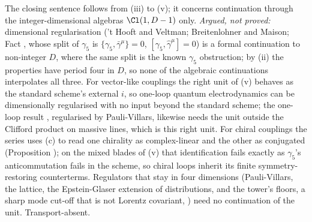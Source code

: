 The closing sentence follows from (iii) to (v); it concerns continuation through the integer-dimensional algebras $\Cl(1, D-1)$ only. \emph{Argued, not proved:} dimensional regularisation ('t Hooft and Veltman; Breitenlohner and Maison; Fact , whose split of $\gamma_5$ is $\{\gamma_5, \bar{\gamma}^{\mu}\} = 0$, $[\gamma_5, \hat{\gamma}^{\mu}] = 0$) is a formal continuation to non-integer $D$, where the same split is the known $\gamma_5$ obstruction; by (ii) the properties have period four in $D$, so none of the algebraic continuations interpolates all three. For vector-like couplings the right unit of (v) behaves as the standard scheme's external $i$, so one-loop quantum electrodynamics can be dimensionally regularised with no input beyond the standard scheme; the one-loop result , regularised by Pauli-Villars, likewise needs the unit outside the Clifford product on massive lines, which is this right unit. For chiral couplings the series uses (c) to read one chirality as complex-linear and the other as conjugated (Proposition ); on the mixed blades of (v) that identification fails exactly as $\gamma_5$'s anticommutation fails in the scheme, so chiral loops inherit its finite symmetry-restoring counterterms. Regulators that stay in four dimensions (Pauli-Villars, the lattice, the Epstein-Glaser extension of distributions, and the tower's floors, a sharp mode cut-off that is not Lorentz covariant, ) need no continuation of the unit. Transport-absent.
